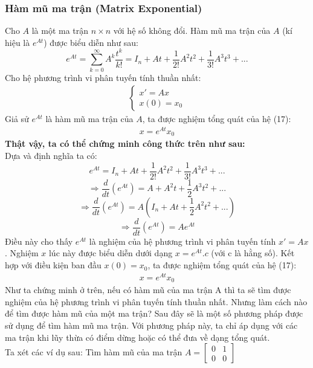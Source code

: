 \subsubsection{Hàm mũ ma trận (Matrix Exponential)}
Cho $A$ là một ma trận $n \times n$ với hệ số không đổi. Hàm mũ ma trận của $A$ (kí hiệu là $e^{At}$) được biểu diễn như sau:\\
$$e^{At}=\sum_{k=0}^{\infty}A^{k}\frac{t^{k}}{k!}=I_n+At+\frac{1}{2!}A^{2}t^{2}+\frac{1}{3!}A^{3}t^{3}+...$$
Cho hệ phương trình vi phân tuyến tính thuần nhất:
\begin{align}
    \begin{cases}
        x'=Ax\\
        x(0)=x_0
    \end{cases}
\end{align}
Giả sử $e^{At}$ là hàm mũ ma trận của $A$, ta được nghiệm tổng quát của hệ (17):
\begin{align}
    x=e^{At}x_0
\end{align}
\textbf{Thật vậy, ta có thể chứng minh công thức trên như sau:}\\
Dựa và định nghĩa ta có:\\
$$e^{At}=I_n+At+\frac{1}{2!}A^{2}t^{2}+\frac{1}{3!}A^{3}t^{3}+...$$
$$\Rightarrow\frac{d}{dt}(e^{At})=A+A^{2}t+\frac{1}{2}A^{3}t^{2}+...$$
$$\Rightarrow\frac{d}{dt}(e^{At})=A(I_n+At+\frac{1}{2}A^{2}t^{2}+...)$$
$$\Rightarrow\frac{d}{dt}(e^{At})=Ae^{At}$$
Điều này cho thấy $e^{At}$ là nghiệm của hệ phương trình vi phân tuyến tính $x'=Ax$. Nghiệm $x$ lúc này được biểu diễn dưới dạng $x=e^{At}.c$ (với c là hằng số). 
Kết hợp với điều kiện ban đầu $x(0)=x_0$, ta được nghiệm tổng quát của hệ (17):
\begin{align*}
    x=e^{At}x_0
\end{align*}
Như ta chứng minh ở trên, nếu có hàm mũ của ma trận A thì ta sẽ tìm được nghiệm của hệ phương trình vi phân tuyến tính thuần nhất. Nhưng làm cách nào để tìm được hàm mũ của một ma trận? Sau đây sẽ là một số phương pháp được sử dụng để tìm hàm mũ ma trận.
Với phương pháp này, ta chỉ áp dụng với các ma trận khi lũy thừa có điểm dừng hoặc có thể đưa về dạng tổng quát.\\
Ta xét các ví dụ sau:
Tìm hàm mũ của ma trận $A=
\begin{bmatrix}
0 & 1\\
0 & 0
\end{bmatrix}$\\
